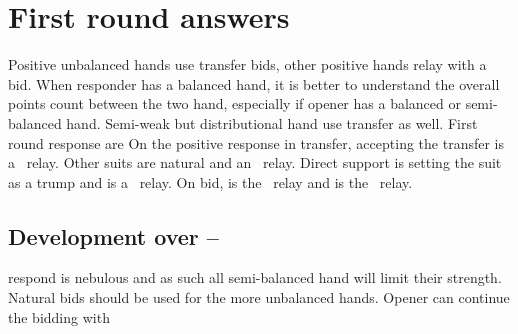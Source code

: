 \section{First round answers}
Positive unbalanced hands use transfer bids, other positive hands relay with a \bid{1\DS} bid. When responder has a balanced hand, it is better to understand the overall points count between the two hand, especially if opener has a balanced or semi-balanced hand. Semi-weak but distributional hand use transfer as well. First round response are
On the positive response in transfer, accepting the transfer is a \lambdaRelay\ relay. Other suits are natural and an \alphaRelay\ relay. Direct support is setting the suit as a trump and is a \gammaRelay\ relay. On \bid{1\SpS} bid, \bid{1\NT} is the \lambdaRelay\ relay and \bid{2\CS} is the \gammaRelay\ relay.
\subsection{Development over \bid{1\CS}–\bid{1\DS}}
\bid{1\DS} respond is nebulous and as such all semi-balanced hand will limit their strength. Natural bids should be used for the more unbalanced hands. Opener can continue the bidding with
